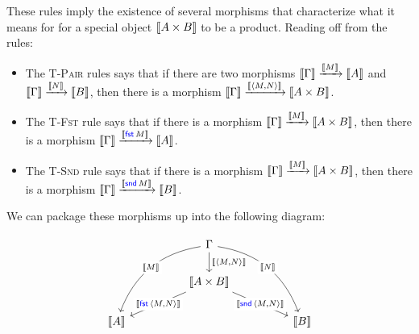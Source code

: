 These rules imply the existence of several morphisms that characterize 
what it means for for a special object $\left\llbracket A \times B \right\rrbracket$ to be a 
product. Reading off from the rules:
\begin{itemize}
  \item The \textsc{T-Pair} rules says that if there are 
  two morphisms $\left\llbracket \Gamma \right\rrbracket \xrightarrow{\left\llbracket M \right\rrbracket} \left\llbracket A \right\rrbracket$ and 
  $\left\llbracket \Gamma \right\rrbracket \xrightarrow{\left\llbracket N \right\rrbracket} \left\llbracket B \right\rrbracket$, 
  then there is a morphism $\left\llbracket \Gamma \right\rrbracket \xrightarrow{\left\llbracket \langle M, N \rangle \right\rrbracket} 
  \left\llbracket A \times B \right\rrbracket$.
  \item The \textsc{T-Fst} rule says that if there is a morphism 
  $\left\llbracket \Gamma \right\rrbracket \xrightarrow{\left\llbracket M \right\rrbracket} 
  \left\llbracket A \times B \right\rrbracket$, then there is a 
  morphism $\left\llbracket \Gamma \right\rrbracket \xrightarrow{\left\llbracket \mathsf{{\color{blue}fst}}\,M \right\rrbracket} \left\llbracket A \right\rrbracket$.
  \item The \textsc{T-Snd} rule says that if there is a morphism 
  $\left\llbracket \Gamma \right\rrbracket \xrightarrow{\left\llbracket M \right\rrbracket} 
  \left\llbracket A \times B \right\rrbracket$, then there is a 
  morphism $\left\llbracket \Gamma \right\rrbracket \xrightarrow{\left\llbracket \mathsf{{\color{blue}snd}}\,M \right\rrbracket} \left\llbracket B \right\rrbracket$.
\end{itemize}

We can package these morphisms up into the following diagram:

\begin{equation}
\begin{tikzcd}[column sep = huge]
  & \Gamma \arrow[d, "{\dbracket{\langle M, N\rangle }}"] \arrow[ldd, "\dbracket{M}" description, bend right] \arrow[rdd, "\dbracket{N}" description, bend left] &   \\
  & \dbracket{A \times B} \arrow[ld, "\dbracket{\plfst{\langle M, N\rangle }}"' description] \arrow[rd, "\dbracket{\plsnd{\langle M, N\rangle }}" description]                                                     &   \\
\dbracket{A} &                                                                                                     & \dbracket{B}
\end{tikzcd}
\label{cd:prod1}
\end{equation}

